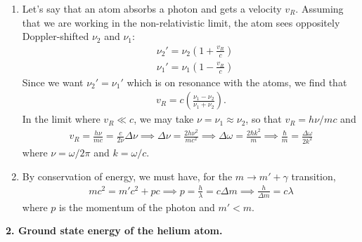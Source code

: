 \documentclass{article}
\theoremstyle{definition}
\newcommand{\f}[2]{\frac{#1}{#2}}
\newcommand{\lp}{\left(}
\newcommand{\rp}{\right)}
\begin{document}
\begin{enumerate}[label=(\alph*)]
	\item Let's say that an atom absorbs a photon and gets a velocity $v_R$. Assuming that we are working in the non-relativistic limit, the atom sees oppositely Doppler-shifted $\nu_2$ and $\nu_1$:
	\begin{align*}
	&\nu_2' = \nu_2 \lp 1 + \f{v_R}{c} \rp\\
	&\nu_1' = \nu_1 \lp 1 - \f{v_R}{c} \rp
	\end{align*}
	Since we want $\nu_2' = \nu_1'$ which is on resonance with the atoms, we find that
	\begin{align*}
	v_R = c\lp \f{\nu_1- \nu_2}{\nu_1 + \nu_2}\rp.
	\end{align*}
	In the limit where $v_R \ll c$, we may take $\nu = \nu_1 \approx \nu_2$, so that $v_R = h\nu / mc$ and 
	\begin{align*}
	v_R = \f{h\nu}{mc} = \f{c}{2\nu}\Delta \nu \implies \Delta \nu = \f{2h\nu^2}{mc^2} \implies \Delta \omega = \f{2\hbar k^2}{m} \implies \boxed{\f{\hbar}{m} = \f{\Delta \omega}{2k^2}}
	\end{align*}
	where $\nu = \omega/2\pi$ and $k = \omega/c$.
	
	
	
	
	\item By conservation of energy, we must have, for the $m \to m' + \gamma$ transition,
	\begin{align*}
	mc^2 = m'c^2 + pc \implies p = \f{h}{\lambda} = c \Delta m  \implies \boxed{\f{h}{\Delta m} = c\lambda}
	\end{align*}
	where $p$ is the momentum of the photon and $m'<m$. 
\end{enumerate}





\noindent \textbf{2. Ground state energy of the helium atom.}
\end{document}
